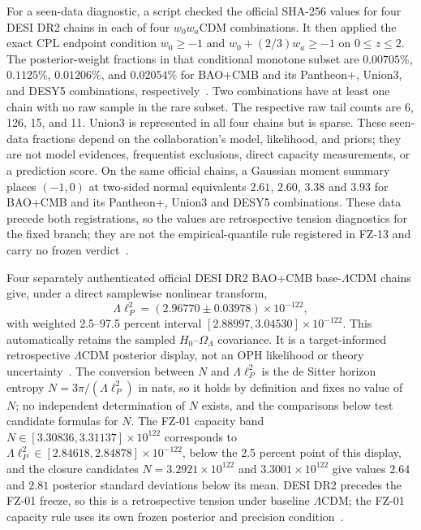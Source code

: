 \documentclass[11pt]{article}
\theoremstyle{remark}
\begin{document}
For a seen-data diagnostic, a script checked the official SHA-256 values for
four DESI DR2 chains in each of four \(w_0w_a\)CDM combinations. It then
applied the exact CPL endpoint condition
\(w_0\ge-1\) and \(w_0+(2/3)w_a\ge-1\) on \(0\le z\le2\). The posterior-weight
fractions in that conditional monotone subset are \(0.00705\%\),
\(0.1125\%\), \(0.01206\%\), and \(0.02054\%\) for BAO+CMB and its Pantheon+,
Union3, and DESY5 combinations, respectively~\cite{desidr2}. Two
combinations have at least one chain with no raw sample in the rare subset.
The respective raw tail counts are 6, 126, 15, and 11. Union3 is represented
in all four chains but is sparse.
These seen-data fractions depend on the collaboration's model, likelihood,
and priors; they are not model evidences, frequentist exclusions, direct
capacity measurements, or a prediction score. On the same official chains, a
Gaussian moment summary places \((-1,0)\) at two-sided normal equivalents
\(2.61\), \(2.60\), \(3.38\) and \(3.93\) for BAO+CMB and its Pantheon+,
Union3 and DESY5 combinations. These data precede both registrations, so the
values are retrospective tension diagnostics for the fixed branch; they are
not the empirical-quantile rule registered in FZ-13 and carry no frozen
verdict~\cite{ophcosmoledger}.

Four separately authenticated official DESI DR2 BAO+CMB base-\(\Lambda\)CDM
chains give, under a direct samplewise nonlinear transform,
\[
 \Lambda\ell_P^2=(2.96770\mathbin{\pm}0.03978)\times10^{-122},
\]
with weighted 2.5--97.5 percent interval
\([2.88997,3.04530]\times10^{-122}\). This automatically retains the sampled
\(H_0\)--\(\Omega_\Lambda\) covariance. It is a target-informed retrospective
\(\Lambda\)CDM posterior display, not an OPH likelihood or theory
uncertainty~\cite{desidr2,ophrepo}. The conversion between \(N\) and
\(\Lambda\ell_P^2\) is the de Sitter horizon entropy
\(N=3\pi/(\Lambda\ell_P^2)\) in nats, so it holds by definition and fixes no
value of \(N\); no independent determination of \(N\) exists, and the
comparisons below test candidate formulas for \(N\). The FZ-01 capacity band
\(N\in[3.30836,3.31137]\times10^{122}\) corresponds to
\(\Lambda\ell_P^2\in[2.84618,2.84878]\times10^{-122}\), below the
2.5 percent point of this display, and the closure candidates
\(N=3.2921\times10^{122}\) and \(3.3001\times10^{122}\) give values \(2.64\)
and \(2.81\) posterior standard deviations below its mean. DESI DR2 precedes
the FZ-01 freeze, so this is a retrospective tension under baseline
\(\Lambda\)CDM; the FZ-01 capacity rule uses its own frozen posterior and
precision condition~\cite{ophladder,ophcosmoledger}.
\end{document}
